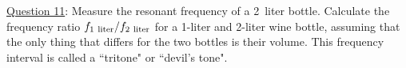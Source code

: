 \documentclass[11pt]{NSF}
\begin{document}
\underline{Question 11}:  Measure the resonant frequency of a 2~liter bottle. Calculate the frequency ratio $f_{\rm 1~liter}/f_{\rm 2~liter}$
for a 1-liter and 2-liter wine bottle, assuming that the only thing 
that differs for the two bottles is their volume.
This frequency interval is called a ``tritone" or ``devil's tone".
\\
\\
\\
\\
\\
\end{document}
